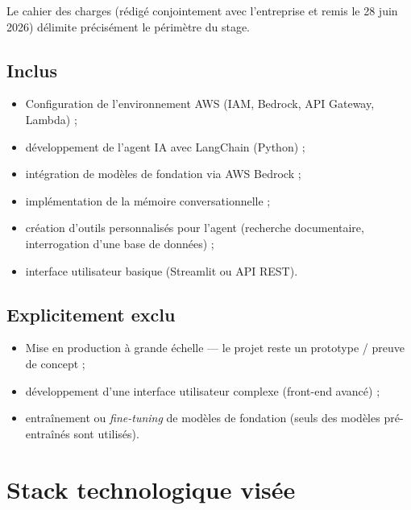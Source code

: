 \documentclass[11pt,a4paper]{report}
\begin{document}
Le cahier des charges (rédigé conjointement avec l'entreprise et remis
le 28 juin 2026) délimite précisément le périmètre du stage.

\subsection*{Inclus}
\begin{itemize}[nosep]
    \item Configuration de l'environnement AWS (IAM, Bedrock, API
    Gateway, Lambda) ;
    \item développement de l'agent IA avec LangChain (Python) ;
    \item intégration de modèles de fondation via AWS Bedrock ;
    \item implémentation de la mémoire conversationnelle ;
    \item création d'outils personnalisés pour l'agent (recherche
    documentaire, interrogation d'une base de données) ;
    \item interface utilisateur basique (Streamlit ou API REST).
\end{itemize}

\subsection*{Explicitement exclu}
\begin{itemize}[nosep]
    \item Mise en production à grande échelle — le projet reste un
    prototype / preuve de concept ;
    \item développement d'une interface utilisateur complexe
    (front-end avancé) ;
    \item entraînement ou \textit{fine-tuning} de modèles de fondation
    (seuls des modèles pré-entraînés sont utilisés).
\end{itemize}

\section{Stack technologique visée}
\end{document}
